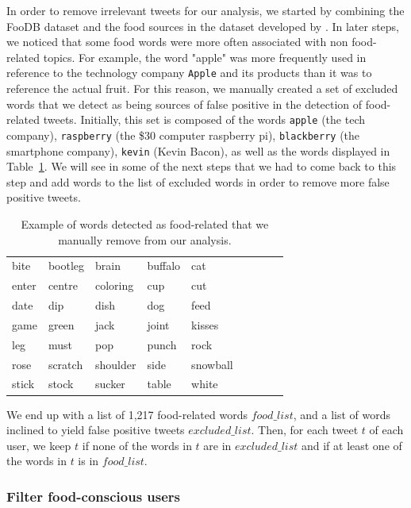 \documentclass[letterpaper]{article}
\begin{document}
In order to remove irrelevant tweets for our analysis, we started by combining
the FooDB dataset and the food sources in the dataset developed by
\citeauthor{abbar2015you}. In later steps, we noticed that some food words were
more often associated with non food-related topics. For example, the word
"apple" was more frequently used in reference to the technology company
\verb+Apple+ and its products than it was to reference the actual fruit. For
this reason, we manually created a set of excluded words that we detect as being
sources of false positive in the detection of food-related tweets. Initially,
this set is composed of the words \verb+apple+ (the tech company),
\verb+raspberry+ (the \$30 computer raspberry pi), \verb+blackberry+ (the
smartphone company), \verb+kevin+ (Kevin Bacon), as well as the words displayed
in Table~\ref{tab:excluded-words}. We will see in some of the next steps that we
had to come back to this step and add words to the list of excluded words in
order to remove more false positive tweets.

\begin{table}
  \center
  \begin{tabular}{lllllllll}
  \toprule
   bite &  bootleg &     brain &  buffalo &       cat \\
  enter &   centre &  coloring &      cup &       cut \\
   date &      dip &      dish &      dog &      feed \\
   game &    green &      jack &    joint &    kisses \\
    leg &     must &       pop &    punch &      rock \\
   rose &  scratch &  shoulder &     side &  snowball \\
  stick &    stock &    sucker &    table &     white \\
  \bottomrule
  \end{tabular}
  \label{tab:excluded-words}
  \caption{Example of words detected as food-related that we manually remove from our analysis.}
\end{table}

We end up with a list of 1,217 food-related words $food\_list$, and a list of words
inclined to yield false positive tweets $excluded\_list$. Then, for each tweet $t$ of each user, we keep $t$ if none of the words in $t$ are in $excluded\_list$ and if at least one of the words in $t$ is in $food\_list$.

\subsubsection{Filter food-conscious users}
\end{document}
